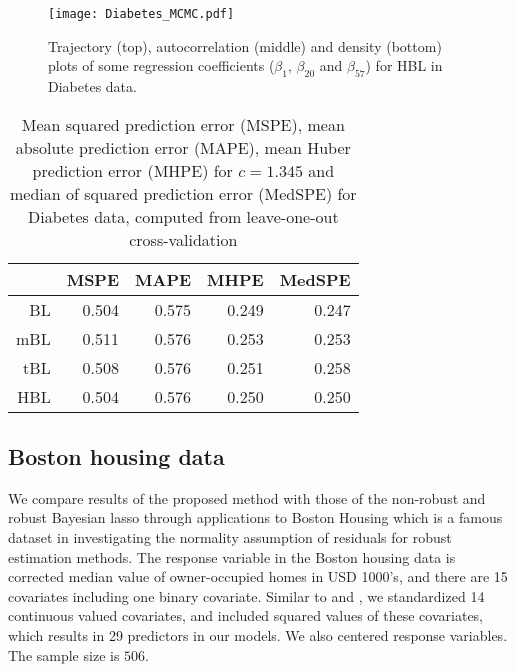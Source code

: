 \documentclass[11pt]{article}
\theoremstyle{plain}
\theoremstyle{definition}
\begin{document}
\begin{figure}[htbp]
\centering
\texttt{[image: Diabetes\_MCMC.pdf]}
\caption{Trajectory (top), autocorrelation (middle) and density (bottom) plots of some regression coefficients ($\beta_1$, $\beta_{20}$ and $\beta_{57}$) for HBL in Diabetes data.}
\label{fig:diabetes_MCMC}
\end{figure}


 
 
\begin{table}[ht]
\caption{Mean squared prediction error (MSPE), mean absolute prediction error (MAPE), mean Huber prediction error (MHPE) for $c=1.345$ and median of squared prediction error (MedSPE) for Diabetes data, computed from leave-one-out cross-validation}
\begin{center}
\begin{tabular}{rrrrr}
  \hline
 & MSPE & MAPE & MHPE & MedSPE \\ 
  \hline
BL & 0.504 & 0.575 & 0.249 & 0.247 \\ 
  mBL & 0.511 & 0.576 & 0.253 & 0.253 \\ 
  tBL & 0.508 & 0.576 & 0.251 & 0.258 \\ 
  HBL & 0.504 & 0.576 & 0.250 & 0.250 \\ 
   \hline
\end{tabular}
\end{center}
\label{tab:diabetes}
\end{table}
 

\subsection{Boston housing data}
\label{subsec:Boston}

We compare results of the proposed method with those of the non-robust and robust Bayesian lasso through applications to Boston Housing \citep{HR78} which is a famous  dataset in investigating the normality assumption of residuals for robust estimation methods. 
The response variable in the Boston housing data is corrected median value of owner-occupied homes in USD 1000's, and there are 15 covariates including one binary covariate. 
Similar to \cite{HS20} and \cite{HIS20}, we standardized 14 continuous valued covariates, and included squared values of these covariates, which results in 29 predictors in our models. We also centered response variables.
The sample size is $506$. 
\end{document}
